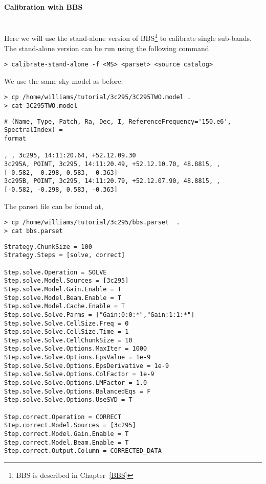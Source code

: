 \paragraph{Calibration with BBS}\mbox{}\\

Here we will use the stand-alone version of BBS\footnote{BBS is described in Chapter~\ref{BBS}} to calibrate single sub-bands. The stand-alone version can be run using the following command
\begin{verbatim}
> calibrate-stand-alone -f <MS> <parset> <source catalog>
\end{verbatim}

We use the same sky model as before:

\begin{verbatim}
> cp /home/williams/tutorial/3c295/3C295TWO.model .
> cat 3C295TWO.model
\end{verbatim}
\begin{lstlisting}
# (Name, Type, Patch, Ra, Dec, I, ReferenceFrequency='150.e6', SpectralIndex) = 
format

, , 3c295, 14:11:20.64, +52.12.09.30
3c295A, POINT, 3c295, 14:11:20.49, +52.12.10.70, 48.8815, , 
[-0.582, -0.298, 0.583, -0.363]
3c295B, POINT, 3c295, 14:11:20.79, +52.12.07.90, 48.8815, , 
[-0.582, -0.298, 0.583, -0.363]
\end{lstlisting}


The parset file can be found at,
\begin{verbatim}
> cp /home/williams/tutorial/3c295/bbs.parset  .
> cat bbs.parset
\end{verbatim}
\begin{lstlisting}
Strategy.ChunkSize = 100
Strategy.Steps = [solve, correct]

Step.solve.Operation = SOLVE
Step.solve.Model.Sources = [3c295]
Step.solve.Model.Gain.Enable = T
Step.solve.Model.Beam.Enable = T
Step.solve.Model.Cache.Enable = T
Step.solve.Solve.Parms = ["Gain:0:0:*","Gain:1:1:*"]
Step.solve.Solve.CellSize.Freq = 0
Step.solve.Solve.CellSize.Time = 1
Step.solve.Solve.CellChunkSize = 10
Step.solve.Solve.Options.MaxIter = 1000
Step.solve.Solve.Options.EpsValue = 1e-9
Step.solve.Solve.Options.EpsDerivative = 1e-9
Step.solve.Solve.Options.ColFactor = 1e-9
Step.solve.Solve.Options.LMFactor = 1.0
Step.solve.Solve.Options.BalancedEqs = F
Step.solve.Solve.Options.UseSVD = T

Step.correct.Operation = CORRECT
Step.correct.Model.Sources = [3c295]
Step.correct.Model.Gain.Enable = T
Step.correct.Model.Beam.Enable = T
Step.correct.Output.Column = CORRECTED_DATA
\end{lstlisting}

